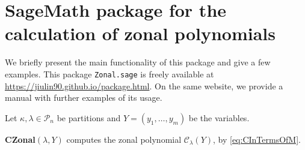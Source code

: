 \documentclass{mathincs}
\numberwithin{equation}{section}
\numberwithin{figure}{section}
\theoremstyle{plain}
\theoremstyle{definition}
\theoremstyle{remark}
\theoremstyle{plain}
\theoremstyle{definition}
\theoremstyle{plain}
\theoremstyle{plain}
\begin{document}
\section{SageMath package for the calculation of zonal polynomials}\label{sec:Package}

We briefly present the main functionality of this package and give a few examples. This package \texttt{Zonal.sage} is freely available at
\url{https://jiulin90.github.io/package.html}.  On the same website, we provide a
manual with further examples of its usage.

Let $\kappa, \lambda\in\mathcal{P}_n$ be partitions and $Y=\left(y_1,\ldots,y_m\right)$ be the variables.
\vspace{10bp}

\noindent \textbf{CZonal}$(\lambda, Y)$
computes the zonal polynomial $\mathcal{C}_{\lambda}(Y)$, by \eqref{eq:CInTermsOfM}.
\end{document}
